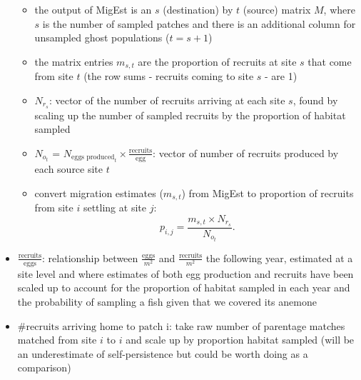 \documentclass[12pt, oneside]{article}   	%
\begin{document}
\begin{itemize}
\begin{itemize}
			\item the output of MigEst is an $s$ (destination) by $t$ (source) matrix $M$, where $s$ is the number of sampled patches and there is an additional column for unsampled ghost populations ($t = s+1$)
			\item the matrix entries $m_{s,t}$ are the proportion of recruits at site $s$ that come from site $t$ (the row sums - recruits coming to site $s$ - are 1)
			\item $N_{r_s}$: vector of the number of recruits arriving at each site $s$, found by scaling up the number of sampled recruits by the proportion of habitat sampled
			\item $N_{o_t}$ = $N_{\text{eggs produced}_t} \times \frac{\text{recruits}}{\text{egg}}$: vector of number of recruits produced by each source site $t$
			\item convert migration estimates ($m_{s,t}$) from MigEst to proportion of recruits from site $i$ settling at site $j$:
			\begin{equation}
			p_{i,j} = \frac{m_{s,t} \times N_{r_s}}{N_{o_t}}. \label{PijfromMigEst}
			\end{equation}
		\end{itemize}
	\item $\frac{\text{recruits}}{\text{eggs}}$: relationship between $\frac{\text{eggs}}{m^2}$ and $\frac{\text{recruits}}{m^2}$ the following year, estimated at a site level and where estimates of both egg production and recruits have been scaled up to account for the proportion of habitat sampled in each year and the probability of sampling a fish given that we covered its anemone
	\item $\# \text{recruits arriving home to patch i}$: take raw number of parentage matches matched from site $i$ to $i$ and scale up by proportion habitat sampled (will be an underestimate of self-persistence but could be worth doing as a comparison)
	

\end{itemize}
\end{document}
